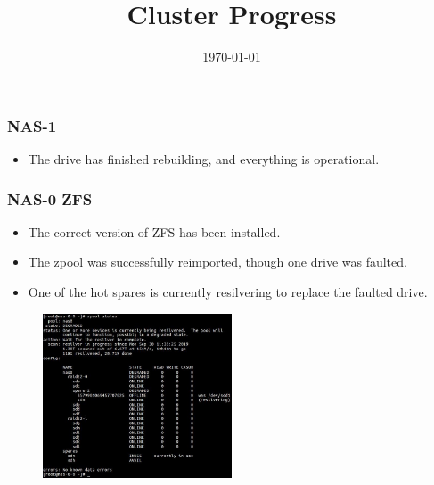 \documentclass{beamer}
\title{Cluster Progress}
\date{\today}
\begin{document}

\begin{frame}
  \maketitle
\end{frame}



\begin{frame}
  \frametitle{NAS-1}

  \begin{itemize}    
  \item The drive has finished rebuilding, and everything is operational. 
  \end{itemize}

\end{frame}

\begin{frame}
  \frametitle{NAS-0 ZFS}

  \begin{itemize}
  \item The correct version of ZFS has been installed.
    
  \item The zpool was successfully reimported, though one drive was faulted.
    
  \item One of the hot spares is currently resilvering to replace the faulted drive. 
  \end{itemize}

  \begin{figure}[H]
    \begin{center}
      \includegraphics[width=0.5\textwidth]{nas-0_zpool_drive_rebuild_2019-09-30_14-15_pm.jpg}
    \end{center}
      \end{figure}
  
\end{frame}
\end{document}
